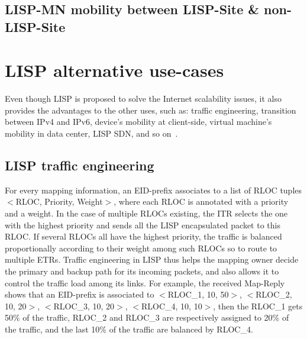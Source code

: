  \subsection{LISP-MN mobility between LISP-Site \&  non-LISP-Site}
 \label{subsec:MN_NLS}

\section{LISP alternative use-cases}
\label{subsec:studies_usecase}
Even though LISP is proposed to solve the Internet scalability issues, it also provides the advantages to the other uses, such as: traffic engineering, transition between IPv4 and IPv6, device's mobility at client-side, virtual machine's mobility in data center, LISP SDN, and so on~\cite{rfc7834}. 

\subsection{LISP traffic engineering}
\label{subsubsec:te}
For every mapping information, an EID-prefix associates to a list of RLOC tuples $<$RLOC, Priority, Weight$>$, where each RLOC is annotated with a priority and a weight. In the case of multiple RLOCs existing, the ITR selects the one with the highest priority and sends all the LISP encapsulated packet to this RLOC. If several RLOCs all have the highest priority, the traffic is balanced proportionally according to their weight among such RLOCs so to route to multiple ETRs. Traffic engineering in LISP thus helps the mapping owner decide the primary and backup path for its incoming packets, and also allows it to control the traffic load among its links. For example, the received Map-Reply shows that an EID-prefix is associated to $<$RLOC\_1, 10, 50$>$, $<$RLOC\_2, 10, 20$>$, $<$RLOC\_3, 10, 20$>$, $<$RLOC\_4, 10, 10$>$, then the RLOC\_1 gets 50\% of the traffic, RLOC\_2 and RLOC\_3 are respectively assigned to 20\% of the traffic, and the last 10\% of the traffic are balanced by RLOC\_4.  %

